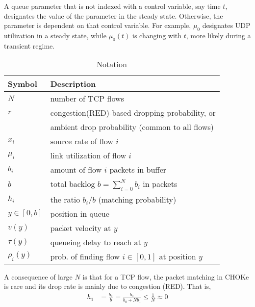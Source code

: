 \documentclass{IEEEtran}
\begin{document}
 A queue parameter that is not indexed with a control variable, say time $t$, designates the value of the parameter in the steady state. Otherwise, the parameter is dependent on that control variable. For example, $\mu_0$ designates UDP utilization in a steady state, while $\mu_0(t)$ is changing with $t$, more likely during a transient regime.

        \begin{table}[h!]\centering
         \caption{Notation}
\label{tab:notation}
         \begin{small}
         \begin{tabular}{| l l |}
         \hline
           Symbol &     Description    \\ [3pt]
           \hline
            $N$      & number of TCP flows                                          \\
$r$     & congestion(RED)-based dropping probability, or              \\
                & ambient drop probability (common to all flows)                    \\
            $x_i$   & source rate of flow $i$                                       \\
            $\mu_i$ & link utilization of flow $i$                                  \\
            $b_i$   & amount of flow $i$ packets in buffer                                    \\
            $b$     & total backlog  $b= \sum_{i=0}^{N} b_i $  in packets           \\
            $h_i$   & the ratio $b_i/b$ (matching probability)                      \\

$y\in[0,b]$   &position in queue                                     \\
           $v(y)$       & packet velocity at $y$                                    \\
           $\tau(y)$    & queueing delay to reach at $y$                            \\
           $\rho_i(y)$     & prob. of finding flow $i\in[0,1]$ at position $y$ \\
           \hline
    \end{tabular}
    \end{small}
    \end{table}

    A consequence of large $N$ is that for a TCP flow, the packet matching in CHOKe is rare and its drop rate is mainly due to congestion (RED). That is,
    \begin{align}\label{eq:tcpNoMatch}
        h_1 &=\frac{b_1}{b}=\frac{b_1}{b_0+Nb_1}\leq \frac{1}{N} \approx 0
    \end{align}
\end{document}
